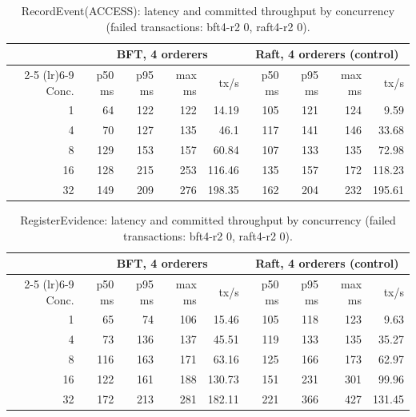\begin{table}[htbp]\centering\footnotesize\setlength{\tabcolsep}{4pt}
\begin{tabular}{@{}rrrrrrrrr@{}}
\toprule
 & \multicolumn{4}{c}{BFT, 4 orderers} & \multicolumn{4}{c}{Raft, 4 orderers (control)}\\
\cmidrule(lr){2-5} \cmidrule(lr){6-9}
Conc. & p50 ms & p95 ms & max ms & tx/s & p50 ms & p95 ms & max ms & tx/s\\
\midrule
1 & 64 & 122 & 122 & 14.19 & 105 & 121 & 124 & 9.59\\
4 & 70 & 127 & 135 & 46.1 & 117 & 141 & 146 & 33.68\\
8 & 129 & 153 & 157 & 60.84 & 107 & 133 & 135 & 72.98\\
16 & 128 & 215 & 253 & 116.46 & 135 & 157 & 172 & 118.23\\
32 & 149 & 209 & 276 & 198.35 & 162 & 204 & 232 & 195.61\\
\bottomrule
\end{tabular}
\caption{RecordEvent(ACCESS): latency and committed throughput by concurrency (failed transactions: bft4-r2 0, raft4-r2 0).}
\label{tab:bench-recordeventaccess}
\end{table}

\begin{table}[htbp]\centering\footnotesize\setlength{\tabcolsep}{4pt}
\begin{tabular}{@{}rrrrrrrrr@{}}
\toprule
 & \multicolumn{4}{c}{BFT, 4 orderers} & \multicolumn{4}{c}{Raft, 4 orderers (control)}\\
\cmidrule(lr){2-5} \cmidrule(lr){6-9}
Conc. & p50 ms & p95 ms & max ms & tx/s & p50 ms & p95 ms & max ms & tx/s\\
\midrule
1 & 65 & 74 & 106 & 15.46 & 105 & 118 & 123 & 9.63\\
4 & 73 & 136 & 137 & 45.51 & 119 & 133 & 135 & 35.27\\
8 & 116 & 163 & 171 & 63.16 & 125 & 166 & 173 & 62.97\\
16 & 122 & 161 & 188 & 130.73 & 151 & 231 & 301 & 99.96\\
32 & 172 & 213 & 281 & 182.11 & 221 & 366 & 427 & 131.45\\
\bottomrule
\end{tabular}
\caption{RegisterEvidence: latency and committed throughput by concurrency (failed transactions: bft4-r2 0, raft4-r2 0).}
\label{tab:bench-registerevidence}
\end{table}

